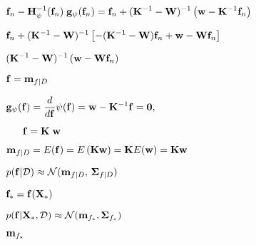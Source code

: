 \documentclass{article}
\def\lthtmlcheckvsize{\ifdim\ht\sizebox<\vsize 
  \ifdim\wd\sizebox<\hsize\expandafter\hfill\fi \expandafter\vfill
  \else\expandafter\vss\fi}%
\begin{document}
{\newpage\clearpage
{}%
$\displaystyle {\bf f}_n-{\bf H}_{\psi}^{-1}({\bf f}_n)\;{\bf g}_{\psi}({\bf f}_n)
={\bf f}_n+({\bf K}^{-1}-{\bf W})^{-1}
\left({\bf w}-{\bf K}^{-1}{\bf f}_n\right)$%
\lthtmlindisplaymathZ
\lthtmlcheckvsize\clearpage}

{\newpage\clearpage
{}%
$\displaystyle {\bf f}_n+({\bf K}^{-1}-{\bf W})^{-1}\left[-({\bf K}^{-1}-{\bf W}){\bf f}_n
+{\bf w}-{\bf W}{\bf f}_n\right]$%
\lthtmlindisplaymathZ
\lthtmlcheckvsize\clearpage}

{\newpage\clearpage
{}%
$\displaystyle ({\bf K}^{-1}-{\bf W})^{-1}\left({\bf w}-{\bf W}{\bf f}_n\right)$%
\lthtmlindisplaymathZ
\lthtmlcheckvsize\clearpage}

{\newpage\clearpage
{}%
$ {\bf f}={\bf m}_{f|D}$%
\lthtmlindisplaymathZ
\lthtmlcheckvsize\clearpage}

{\newpage\clearpage
{}%
$\displaystyle {\bf g}_{\psi}({\bf f})=\frac{d}{d{\bf f}} \psi({\bf f})
={\bf w}-{\bf K}^{-1}{\bf f}
={\bf0},\;\;\;\;\;\;$%
\lthtmlindisplaymathZ
\lthtmlcheckvsize\clearpage}

{\newpage\clearpage
{}%
$\displaystyle \;\;\;\;\;\;
{\bf f}={\bf K}\;{\bf w}$%
\lthtmlindisplaymathZ
\lthtmlcheckvsize\clearpage}

{\newpage\clearpage
{}%
$\displaystyle {\bf m}_{f|D}=E({\bf f})=E\left( {\bf K}{\bf w}\right)
= {\bf K} E( {\bf w})={\bf K}{\bf w}$%
\lthtmlindisplaymathZ
\lthtmlcheckvsize\clearpage}

{\newpage\clearpage
{}%
$ p({\bf f}|{\cal D})\approx{\cal N}({\bf m}_{f|D},\,{\bf\Sigma}_{f|D})$%
\lthtmlindisplaymathZ
\lthtmlcheckvsize\clearpage}

{\newpage\clearpage
{}%
$ {\bf f}_*={\bf f}({\bf X}_*)$%
\lthtmlindisplaymathZ
\lthtmlcheckvsize\clearpage}

{\newpage\clearpage
{}%
$\displaystyle p({\bf f}|{\bf X}_*,{\cal D})\approx
{\cal N}({\bf m}_{f_*},{\bf\Sigma}_{f_*})$%
\lthtmlindisplaymathZ
\lthtmlcheckvsize\clearpage}

{\newpage\clearpage
{}%
$ {\bf m}_{f_*}$%
\lthtmlindisplaymathZ
\lthtmlcheckvsize\clearpage}
\end{document}
